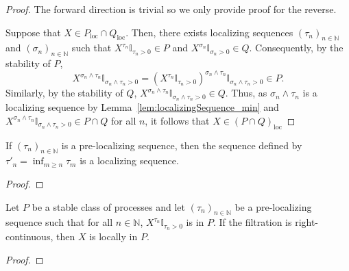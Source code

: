 \begin{proof}\leanok
The forward direction is trivial so we only provide proof for the reverse.

Suppose that $X \in P_{\mathrm{loc}}\cap Q_{\mathrm{loc}}$. Then, there exists localizing sequences $(\tau_n)_{n \in \mathbb{N}}$ and $(\sigma_n)_{n \in \mathbb{N}}$ such that $X^{\tau_n} \mathbb{I}_{\tau_n > 0}\in P$ and $X^{\sigma_n} \mathbb{I}_{\sigma_n > 0} \in Q$. Consequently, by the stability of $P$,
\[X^{\sigma_n \wedge \tau_n} \mathbb{I}_{\sigma_n \wedge \tau_n > 0} = (X^{\tau_n} \mathbb{I}_{\tau_n > 0})^{\sigma_n \wedge \tau_n} \mathbb{I}_{\sigma_n \wedge \tau_n > 0} \in P.\]
Similarly, by the stability of $Q$, $X^{\sigma_n \wedge \tau_n} \mathbb{I}_{\sigma_n \wedge \tau_n > 0} \in Q$. Thus, as $\sigma_n \wedge \tau_n$ is a localizing sequence by Lemma~\ref{lem:localizingSequence_min} and $X^{\sigma_n \wedge \tau_n} \mathbb{I}_{\sigma_n \wedge \tau_n > 0} \in P \cap Q$ for all $n$, it follows that $X \in (P \cap Q)_{\mathrm{loc}}$
\end{proof}

\begin{lemma}\label{lem:isLocalizingSequence_of_isPreLocalizingSequence}
  \leanok
If $(\tau_n)_{n \in \mathbb{N}}$ is a pre-localizing sequence, then the sequence defined by $\tau'_n = \inf_{m \ge n} \tau_m$ is a localizing sequence.
\end{lemma}

\begin{proof}\leanok

\end{proof}


\begin{lemma}\label{lem:locally_of_isPreLocalizingSequence}
  \leanok
Let $P$ be a stable class of processes and let $(\tau_n)_{n \in \mathbb{N}}$ be a pre-localizing sequence such that for all $n \in \mathbb{N}$, $X^{\tau_n}\mathbb{I}_{\tau_n > 0}$ is in $P$.
If the filtration is right-continuous, then $X$ is locally in $P$.
\end{lemma}

\begin{proof}\leanok

\end{proof}


